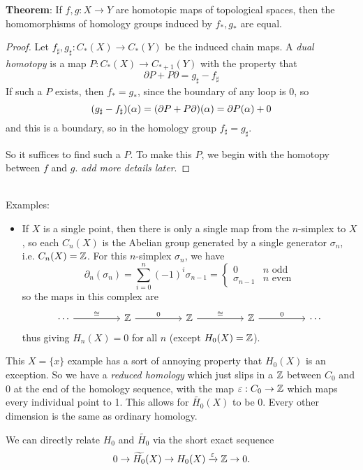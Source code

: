 \documentclass{amsart}
\begin{document}
	 \textbf{Theorem}: If $f,g:X\to Y$ are homotopic maps of topological spaces, then the homomorphisms of homology groups induced by $f_*,g_*$ are equal.
	 \begin{proof}
	 	Let $f_{\sharp},g_{\sharp}:C_*(X)\to C_*(Y)$ be the induced chain maps. A \textit{dual homotopy} is a map $P:C_*(X)\to C_{*+1}(Y)$ with the property that
	 	$$
	 	\partial P + P\partial = g_{\sharp} - f_{\sharp}
	 	$$
	 	If such a $P$ exists, then $f_*=g_*$, since the boundary of any loop is $0$, so 
	 	$$
	 	(g_{\sharp} - f_{\sharp})(\alpha) = (\partial P + P\partial)(\alpha) = \partial P(\alpha) + 0 
	 	$$
	 	and this is a boundary, so in the homology group $f_{\sharp} = g_{\sharp}$.
	 	
	 	So it suffices to find such a $P$. To make this $P$, we begin with the homotopy between $f$ and $g$. \textit{add more details later}.
	 \end{proof}\\
	 
	 Examples:
	 \begin{itemize}
	 	\item If $X$ is a single point, then there is only a single map from the $n$-simplex to $X$, so each $C_n(X)$ is the Abelian group generated by a single generator $\sigma_n$, i.e. $C_n(X)=\mathbb{Z}$. For this $n$-simplex $\sigma_n$, we have 
	 	$$
	 	\partial_n (\sigma_n) = \sum_{i=0}^{n} (-1)^i \sigma_{n-1} = \begin{cases} 0 & n \text{ odd}\\
	 		\sigma_{n-1} & n \text{ even}
	 	\end{cases}
	 	$$
	 	so the maps in this complex are 
	 	$$
	 	\begin{tikzcd}
	 		\cdots && {\Z} && {\Z} && {\Z} && \cdots
	 		\arrow["\cong", from=1-1, to=1-3]
	 		\arrow["0", from=1-3, to=1-5]
	 		\arrow["\cong", from=1-5, to=1-7]
	 		\arrow["0", from=1-7, to=1-9]
	 	\end{tikzcd}
	 	$$
	 	thus giving $H_n(X) = 0$ for all $n$ (except $H_0(X)=\mathbb{Z}$).
	 \end{itemize}
	 \medspace
	 
	 This $X=\{x\}$ example has a sort of annoying property that $H_0(X)$ is an exception. So we have a \textit{reduced homology} which just slips in a $\mathbb{Z}$ between $C_0$ and $0$ at the end of the homology sequence, with the map $\varepsilon:C_0\to \mathbb{Z}$ which maps every individual point to 1. This allows for $\widetilde{H_0}(X)$ to be 0. Every other dimension is the same as ordinary homology.
	 
	 We can directly relate $H_0$ and $\widetilde{H_0}$ via the short exact sequence
	 $$
	 0 \to \widetilde{H_0}(X) \to H_0(X) \xrightarrow{\varepsilon} \mathbb{Z}\to 0.
	 $$
	 
\end{document}
